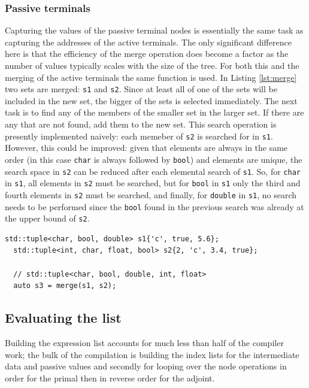 \documentclass[a4paper,10pt]{article}
\begin{document}
\subsubsection{Passive terminals}
Capturing the values of the passive terminal nodes is essentially the same task as capturing the addresses of the active terminals. The only significant difference here is that the efficiency of the merge operation does become a factor as the number of values typically scales with the size of the tree. For both this and the merging of the active terminals the same function is used. In Listing \ref{lst:merge} two sets are merged: \texttt{s1} and \texttt{s2}. Since at least all of one of the sets will be included in the new set, the bigger of the sets is selected immediately. The next task is to find any of the members of the smaller set in the larger set. If there are any that are not found, add them to the new set. This search operation is presently implemented naively: each memeber of \texttt{s2} is searched for in \texttt{s1}. However, this could be improved: given that elements are always in the same order (in this case \texttt{char} is always followed by \texttt{bool}) and elements are unique, the search space in \texttt{s2} can be reduced after each elemental search of \texttt{s1}. So, for \texttt{char} in \texttt{s1}, all elements in \texttt{s2} must be searched, but for \texttt{bool} in \texttt{s1} only the third and fourth elements in \texttt{s2} must be searched, and finally, for \texttt{double} in \texttt{s1}, no search needs to be performed since the \texttt{bool} found in the previous search was already at the upper bound of \texttt{s2}.\newline
\begin{lstlisting}[caption={A simplified example of merging two sets.}, label=lst:merge]
  std::tuple<char, bool, double> s1{'c', true, 5.6};
  std::tuple<int, char, float, bool> s2{2, 'c', 3.4, true};

  // std::tuple<char, bool, double, int, float>
  auto s3 = merge(s1, s2);
\end{lstlisting}

\subsection{Evaluating the list}
Building the expression list accounts for much less than half of the compiler work; the bulk of the compilation is building the index lists for the intermediate data and passive values and secondly for looping over the node operations in order for the primal then in reverse order for the adjoint.
\end{document}
